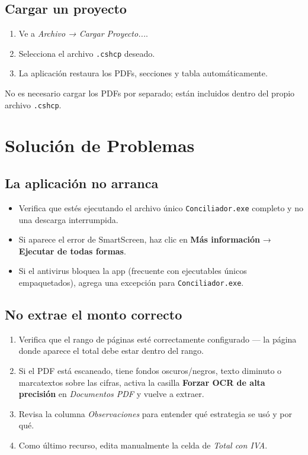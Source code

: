 \documentclass[12pt, a4paper, oneside]{report}
\newcommand{\campo}[1]{\textit{#1}}
\begin{document}
\section{Cargar un proyecto}

\begin{enumerate}
  \item Ve a \textit{Archivo → Cargar Proyecto...}.
  \item Selecciona el archivo \texttt{.cshcp} deseado.
  \item La aplicación restaura los PDFs, secciones y tabla automáticamente.
\end{enumerate}

\begin{notabox}
No es necesario cargar los PDFs por separado; están incluidos dentro del
propio archivo \texttt{.cshcp}.
\end{notabox}

\chapter{Solución de Problemas}

\section{La aplicación no arranca}

\begin{itemize}
  \item Verifica que estés ejecutando el archivo único \texttt{Conciliador.exe}
        completo y no una descarga interrumpida.
  \item Si aparece el error de SmartScreen, haz clic en \textbf{Más información}
        → \textbf{Ejecutar de todas formas}.
  \item Si el antivirus bloquea la app (frecuente con ejecutables únicos
        empaquetados), agrega una excepción para \texttt{Conciliador.exe}.
\end{itemize}

\section{No extrae el monto correcto}

\begin{enumerate}
  \item Verifica que el rango de páginas esté correctamente configurado —
        la página donde aparece el total debe estar dentro del rango.
  \item Si el PDF está escaneado, tiene fondos oscuros/negros, texto diminuto o
        marcatextos sobre las cifras, activa la casilla
        \textbf{Forzar OCR de alta precisión} en \textit{Documentos PDF} y vuelve
        a extraer.
  \item Revisa la columna \campo{Observaciones} para entender qué estrategia
        se usó y por qué.
  \item Como último recurso, edita manualmente la celda de \campo{Total con IVA}.
\end{enumerate}
\end{document}
